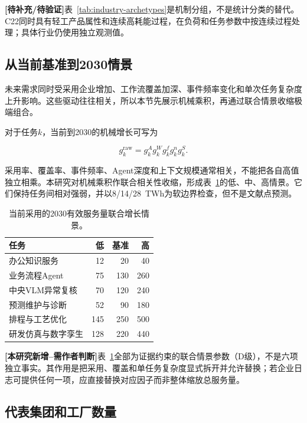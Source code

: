 \documentclass[preprint]{elsarticle}
\newcommand{\newwork}{\textcolor{orange!80!black}{\textbf{[本研究新增--需作者判断]}}}
\newcommand{\pending}{\textcolor{red!70!black}{\textbf{[待补充/待验证]}}}
\begin{document}
\pending 表~\ref{tab:industry-archetypes}是机制分组，不是统计分类的替代。C22同时具有轻工产品属性和连续高耗能过程，在负荷和任务参数中按连续过程处理；具体行业仍使用独立观测值。

\subsection{从当前基准到2030情景}

未来需求同时受采用企业增加、工作流覆盖加深、事件频率变化和单次任务复杂度上升影响。这些驱动往往相关，所以本节先展示机械乘积，再通过联合情景收缩极端组合。

对于任务$k$，当前到2030的机械增长可写为

\begin{equation}
 g_k^{\mathrm{raw}}
 =g^A_kg^W_kg^f_kg^n_kg^S_k.
 \label{eq:raw-growth}
\end{equation}

采用率、覆盖率、事件频率、Agent深度和上下文规模通常相关，不能把各自高值独立相乘。本研究对机械乘积作联合相关性收缩，形成表~\ref{tab:service-growth}的低、中、高情景。它们保持任务间相对强弱，并以8/14/28~TWh为软边界检查，但不是文献点预测。

\begin{table}[htbp]
 \centering
 \caption{当前采用的2030有效服务量联合增长情景。}
 \label{tab:service-growth}
 \begin{tabular}{lrrr}
  \toprule
  任务 & 低 & 基准 & 高 \\
  \midrule
  办公知识服务 & 12 & 20 & 40 \\
  业务流程Agent & 75 & 130 & 260 \\
  中央VLM异常复核 & 70 & 120 & 240 \\
  预测维护与诊断 & 52 & 90 & 180 \\
  排程与工艺优化 & 145 & 250 & 500 \\
  研发仿真与数字孪生 & 128 & 220 & 440 \\
  \bottomrule
 \end{tabular}
\end{table}

\newwork 表~\ref{tab:service-growth}全部为证据约束的联合情景参数（D级），不是六项独立事实。其作用是把采用、覆盖和单任务复杂度显式拆开并允许替换；若企业日志可提供任何一项，应直接替换对应因子而非整体缩放总服务量。

\subsection{代表集团和工厂数量}
\end{document}
